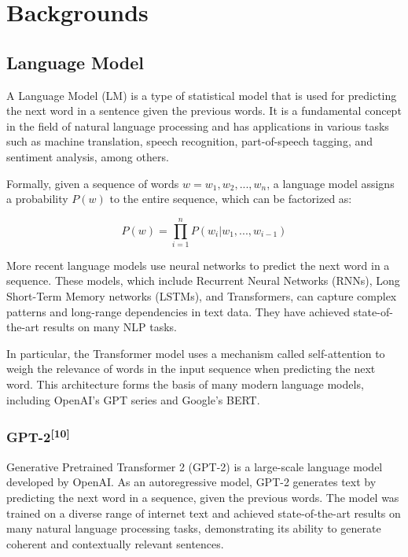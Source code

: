 \documentclass{article}
\begin{document}
\section{Backgrounds}


\subsection{Language Model}

A Language Model (LM) is a type of statistical model that is used for predicting the next word in a sentence given the previous words. It is a fundamental concept in the field of natural language processing and has applications in various tasks such as machine translation, speech recognition, part-of-speech tagging, and sentiment analysis, among others.

Formally, given a sequence of words $w = w_1, w_2, ..., w_n$, a language model assigns a probability $P(w)$ to the entire sequence, which can be factorized as:

\begin{equation}
P(w) = \prod_{i=1}^{n}P(w_i|w_1, ..., w_{i-1})
\end{equation}

More recent language models use neural networks to predict the next word in a sequence. These models, which include Recurrent Neural Networks (RNNs), Long Short-Term Memory networks (LSTMs), and Transformers, can capture complex patterns and long-range dependencies in text data. They have achieved state-of-the-art results on many NLP tasks.

In particular, the Transformer model uses a mechanism called self-attention to weigh the relevance of words in the input sequence when predicting the next word. This architecture forms the basis of many modern language models, including OpenAI's GPT series and Google's BERT.

\subsubsection{GPT-2\textsuperscript{[10]}}

Generative Pretrained Transformer 2 (GPT-2) is a large-scale language model developed by OpenAI. As an autoregressive model, GPT-2 generates text by predicting the next word in a sequence, given the previous words. The model was trained on a diverse range of internet text and achieved state-of-the-art results on many natural language processing tasks, demonstrating its ability to generate coherent and contextually relevant sentences.
\end{document}
